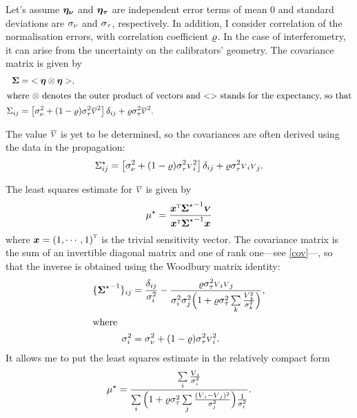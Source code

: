 \documentclass{pasa}
\begin{document}
Let's assume $\boldsymbol{\eta_\nu}$ and $\boldsymbol{\eta_\tau}$ are independent error terms of mean 0 and standard deviations are $\sigma_\nu$ and $\sigma_\tau$, respectively. In addition, I consider correlation of the normalisation errors, with correlation coefficient $\varrho$.  In the case of interferometry, it can arise from the uncertainty on the calibrators' geometry.  The covariance matrix is given by
\begin{align}
    \boldsymbol{\Sigma}     &=  {<\boldsymbol{\eta}\otimes\boldsymbol{\eta}>} ,\\
\intertext{where $\otimes$ denotes the outer product of vectors and $ {<>} $ stands for the expectancy, so that}
    \Sigma_{ij} &= \left[ \sigma_\nu^2 
                  + (1-\varrho)\sigma_\tau^2\overline{{\scriptstyle V}}^2
                \right] \delta_{ij} 
            + \varrho\sigma_\tau^2\overline{{\scriptstyle V}}^2.
\end{align}

The value $\overline{{\scriptstyle V}}$ is yet to be determined, so the covariances are often derived using the data in the propagation:
\begin{equation}
    \Sigma_{ij}^\star = \left[ 
                    \sigma_\nu^2 
                  + (1-\varrho)\sigma_\tau^2 {\scriptstyle V}_i^2
                \right] \delta_{ij} 
            + \varrho\sigma_\tau^2{\scriptstyle V}_i{\scriptstyle V}_j. \label{eq:cov}
\end{equation}

The least squares estimate for $\overline{{\scriptstyle V}}$ is given by
\begin{equation}
    \mu^\star =
                  \frac { {\boldsymbol{x}}^\text{\textsc{t}}{\ensuremath{\boldsymbol{\Sigma}}^\star}^{-1}\boldsymbol{{\scriptstyle V}} }
                        { {\boldsymbol{x}}^\text{\textsc{t}}{\ensuremath{\boldsymbol{\Sigma}}^\star}^{-1}\boldsymbol{x} }
\end{equation}
where $\boldsymbol{x} = {(1, \cdots, 1)}^\text{\textsc{t}}$ is the trivial sensitivity vector.  The covariance matrix is the sum of an invertible diagonal matrix and one of rank one---see \eqref{cov}---, so that the inverse is obtained using the Woodbury matrix identity: 
\begin{align}
    \{ {\boldsymbol{\Sigma}^\star}^{-1} \}_{ij} &= \frac{\delta_{ij}}{\sigma_i^2}
         - \frac{\varrho\sigma_\tau^2{\scriptstyle V}_i{\scriptstyle V}_j}
                {\sigma_i^2\sigma_j^2\Big(1 + 
            \varrho\sigma_\tau^2\sum\limits_{k} \frac{{\scriptstyle V}_k^2}{\sigma_k^2}\Big)},\\
  \intertext{where}
  \sigma_i^2 &= \sigma_\nu^2+(1-\varrho)\sigma_\tau^2{\scriptstyle V}_i^2.
\end{align}
It allows me to put the least squares estimate in the relatively compact form 
\begin{equation}
  \mu^\star = 
    \frac { 
      \sum\limits_i \frac{{\scriptstyle V}_i}{\sigma_i^2}
    }{ 
      \sum\limits_i 
          \Big( 1   
             + \varrho\sigma_\tau^2\sum\limits_{j} \frac{({\scriptstyle V}_i-{\scriptstyle V}_j)^2}{\sigma_j^2}
           \Big)
          \frac{1}{\sigma_i^2} 
   }.\label{eq:mu}
\end{equation}
\end{document}
